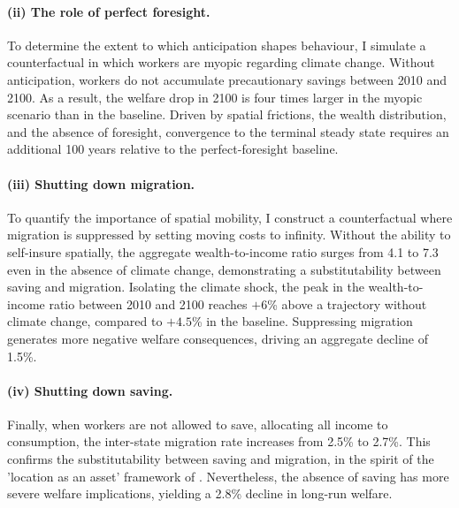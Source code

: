 \documentclass[11pt, a4paper]{article}
\begin{document}
\paragraph{(ii) The role of perfect foresight.} To determine the extent to which anticipation shapes behaviour, I simulate a counterfactual in which workers are myopic regarding climate change. Without anticipation, workers do not accumulate precautionary savings between 2010 and 2100. As a result, the welfare drop in 2100 is four times larger in the myopic scenario than in the baseline. Driven by spatial frictions, the wealth distribution, and the absence of foresight, convergence to the terminal steady state requires an additional 100 years relative to the perfect-foresight baseline.

\paragraph{(iii) Shutting down migration.} To quantify the importance of spatial mobility, I construct a counterfactual where migration is suppressed by setting moving costs to infinity. Without the ability to self-insure spatially, the aggregate wealth-to-income ratio surges from 4.1 to 7.3 even in the absence of climate change, demonstrating a substitutability between saving and migration. Isolating the climate shock, the peak in the wealth-to-income ratio between 2010 and 2100 reaches $+6$\% above a trajectory without climate change, compared to $+4.5$\% in the baseline. Suppressing migration generates more negative welfare consequences, driving an aggregate decline of 1.5\%.

\paragraph{(iv) Shutting down saving.} Finally, when workers are not allowed to save, allocating all income to consumption, the inter-state migration rate increases from 2.5\% to 2.7\%. This confirms the substitutability between saving and migration, in the spirit of the 'location as an asset' framework of \citet{bilal_location_2021}. Nevertheless, the absence of saving has more severe welfare implications, yielding a 2.8\% decline in long-run welfare.
\end{document}
